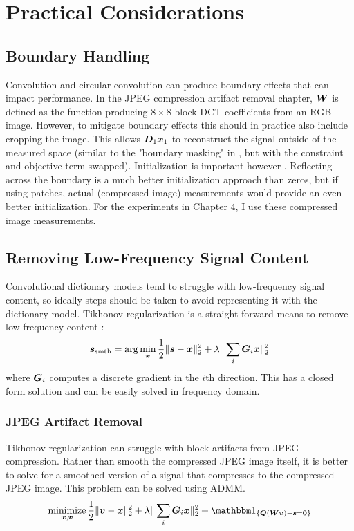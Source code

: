 \chapter{Practical Considerations}
\section{Boundary Handling}
Convolution and circular convolution can produce boundary effects that can impact performance. In the JPEG compression artifact removal chapter, $\bm{W}$ is defined as the function producing $8 \times 8$ block DCT coefficients from an RGB image. However, to mitigate boundary effects this should in practice also include cropping the image. This allows $\bm{D}_1\bm{x}_1$ to reconstruct the signal outside of the measured space (similar to the "boundary masking" in \cite{wohlberg2016boundary}, but with the constraint and objective term swapped). Initialization is important however \cite{DBLP:journals/corr/WohlbergR17}. Reflecting across the boundary is a much better initialization approach than zeros, but if using patches, actual (compressed image) measurements would provide an even better initialization. For the experiments in Chapter $4$, I use these compressed image measurements.
\section{Removing Low-Frequency Signal Content}
Convolutional dictionary models tend to struggle with low-frequency signal content, so ideally steps should be taken to avoid representing it with the dictionary model. Tikhonov regularization is a straight-forward means to remove low-frequency content \cite{garcia2018convolutional}:
\begin{equation}
\bm{s}_{\text{smth}} = \arg\min_{\bm{x}} \frac{1}{2}\|\bm{s} - \bm{x}\|_2^2 + \lambda\|\sum_i \bm{G}_i\bm{x}\|_2^2
\end{equation}
where $\bm{G}_i$ computes a discrete gradient in the $i$th direction. This has a closed form solution and can be easily solved in frequency domain.
\subsection{JPEG Artifact Removal}
Tikhonov regularization can struggle with block artifacts from JPEG compression. Rather than smooth the compressed JPEG image itself, it is better to solve for a smoothed version of a signal that compresses to the compressed JPEG image. This problem can be solved using ADMM.
\begin{equation}
\minimize_{\vx,\vv} \frac{1}{2}\|\vv - \vx\|_2^2 + \lambda\|\sum_i \mG_i\vx\|_2^2 + \indicator_{\{\mQ(\mW\vv) - \vs = \vzero\}}
\end{equation}

